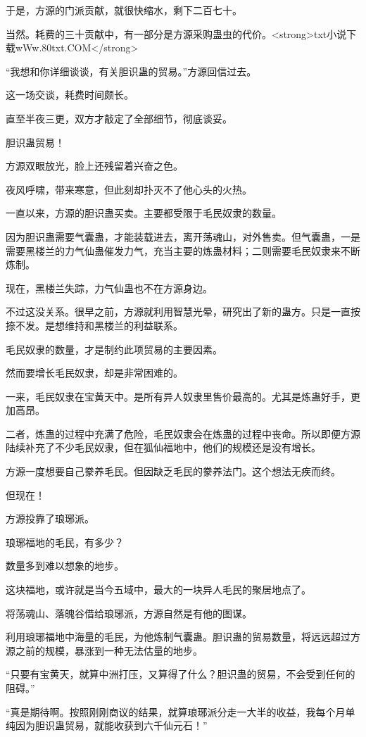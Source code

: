 \begin{this_body}
于是，方源的门派贡献，就很快缩水，剩下二百七十。

当然。耗费的三十贡献中，有一部分是方源采购蛊虫的代价。<strong>txt小说下载wWw.80txt.COM</strong>

“我想和你详细谈谈，有关胆识蛊的贸易。”方源回信过去。

这一场交谈，耗费时间颇长。

直至半夜三更，双方才敲定了全部细节，彻底谈妥。

胆识蛊贸易！

方源双眼放光，脸上还残留着兴奋之色。

夜风呼啸，带来寒意，但此刻却扑灭不了他心头的火热。

一直以来，方源的胆识蛊买卖。主要都受限于毛民奴隶的数量。

因为胆识蛊需要气囊蛊，才能装载进去，离开荡魂山，对外售卖。但气囊蛊，一是需要黑楼兰的力气仙蛊催发力气，充当主要的炼蛊材料；二则需要毛民奴隶来不断炼制。

现在，黑楼兰失踪，力气仙蛊也不在方源身边。

不过这没关系。很早之前，方源就利用智慧光晕，研究出了新的蛊方。只是一直按捺不发。是想维持和黑楼兰的利益联系。

毛民奴隶的数量，才是制约此项贸易的主要因素。

然而要增长毛民奴隶，却是非常困难的。

一来，毛民奴隶在宝黄天中。是所有异人奴隶里售价最高的。尤其是炼蛊好手，更加高昂。

二者，炼蛊的过程中充满了危险，毛民奴隶会在炼蛊的过程中丧命。所以即便方源陆续补充了不少毛民奴隶，但在狐仙福地中，他们的规模还是没有增长。

方源一度想要自己豢养毛民。但因缺乏毛民的豢养法门。这个想法无疾而终。

但现在！

方源投靠了琅琊派。

琅琊福地的毛民，有多少？

数量多到难以想象的地步。

这块福地，或许就是当今五域中，最大的一块异人毛民的聚居地点了。

将荡魂山、落魄谷借给琅琊派，方源自然是有他的图谋。

利用琅琊福地中海量的毛民，为他炼制气囊蛊。胆识蛊的贸易数量，将远远超过方源之前的规模，暴涨到一种无法估量的地步。

“只要有宝黄天，就算中洲打压，又算得了什么？胆识蛊的贸易，不会受到任何的阻碍。”

“真是期待啊。按照刚刚商议的结果，就算琅琊派分走一大半的收益，我每个月单纯因为胆识蛊贸易，就能收获到六千仙元石！”


\end{this_body}
